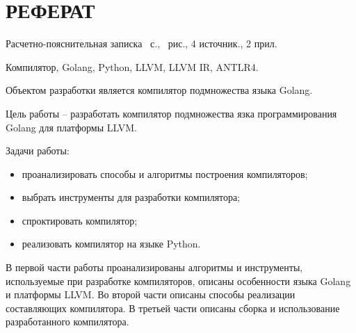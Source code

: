 \section*{РЕФЕРАТ}

Расчетно-пояснительная записка~\pageref{LastPage} с.,
\totalfigures\ рис., 4 источник., 2 прил.

Компилятор, Golang, Python, LLVM, LLVM IR, ANTLR4.

Объектом разработки является компилятор подмножества языка Golang.

Цель работы – разработать компилятор подмножества язка программирования
Golang для платформы LLVM.

Задачи работы:
\begin{itemize}
    \item проанализировать способы и алгоритмы построения компиляторов;
    \item выбрать инструменты для разработки компилятора;
    \item спроктировать компилятор;
    \item реализовать компилятор на языке Python.
\end{itemize}

В первой части работы проанализированы алгоритмы и инструменты,
используемые при разработке компиляторов, описаны особенности языка
Golang и платформы LLVM. Во второй части описаны способы реализации
составляющих компилятора. В третьей части описаны сборка и использование
разработанного компилятора.